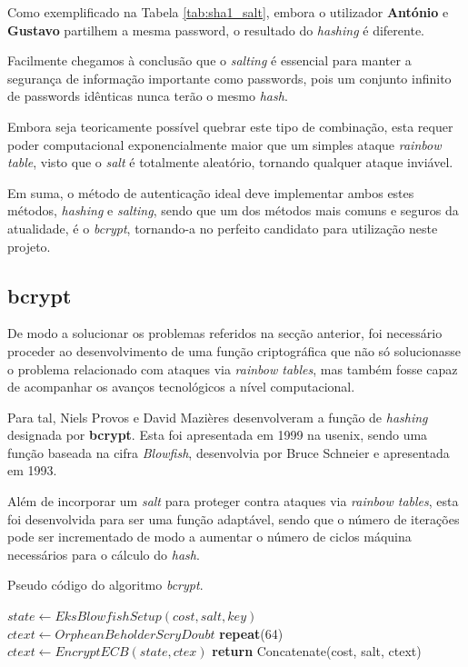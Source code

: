 Como exemplificado na Tabela \ref{tab:sha1_salt}, embora o utilizador \textbf{António} e \textbf{Gustavo} partilhem a mesma password, o resultado do \emph{hashing} é diferente.

Facilmente chegamos à conclusão que o \emph{salting} é essencial para manter a segurança de informação importante como passwords, pois um conjunto infinito de passwords idênticas nunca terão o mesmo \emph{hash}.

Embora seja teoricamente possível quebrar este tipo de combinação, esta requer poder computacional exponencialmente maior que um simples ataque \emph{rainbow table}, visto que o \emph{salt} é totalmente aleatório, tornando qualquer ataque inviável.

Em suma, o método de autenticação ideal deve implementar ambos estes métodos, \emph{hashing} e \emph{salting}, sendo que um dos métodos mais comuns e seguros da atualidade, é o \emph{bcrypt}, tornando-a no perfeito candidato para utilização neste projeto.

\cleardoublepage
\subsection{bcrypt}

De modo a solucionar os problemas referidos na secção anterior, foi necessário proceder ao desenvolvimento de uma função criptográfica que não só solucionasse o problema relacionado com ataques via \emph{rainbow tables}, mas também fosse capaz de acompanhar os avanços tecnológicos a nível computacional.

Para tal, Niels Provos e David Mazières desenvolveram a função de \emph{hashing} designada por \textbf{bcrypt}. Esta foi apresentada em 1999 na \gls{usenix}, sendo uma função baseada na cifra \emph{Blowfish}, desenvolvia por Bruce Schneier e apresentada em 1993.

Além de incorporar um \emph{salt} para proteger contra ataques via \emph{rainbow tables}, esta foi desenvolvida para ser uma função adaptável, sendo que o número de iterações pode ser incrementado de modo a aumentar o número de ciclos máquina necessários para o cálculo do \emph{hash}. 

\begin{algorithm}
    \caption{Pseudo código do algoritmo \emph{bcrypt}.}
    \begin{algorithmic}[1]
        \State $state\gets EksBlowfishSetup(cost,salt,key)$
        \State $ctext\gets OrpheanBeholderScryDoubt$
        \State \textbf{repeat}(64)
        \State \indent $ctext\gets EncryptECB(state, ctex)$
        \State \textbf{return} Concatenate(cost, salt, ctext)
    \EndFunction
    \end{algorithmic}
\end{algorithm}

